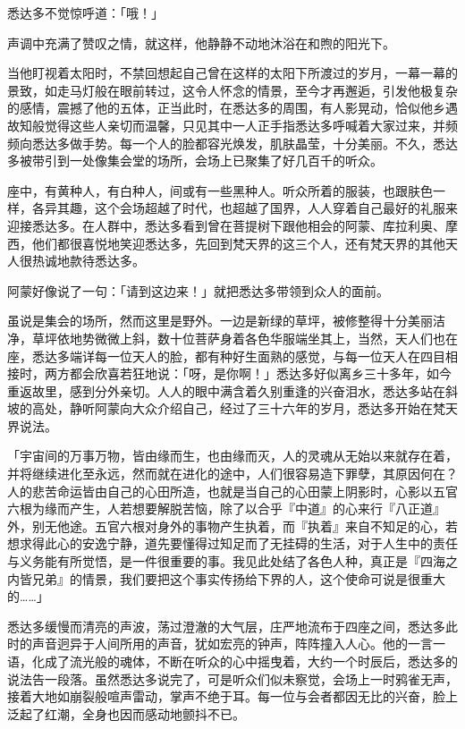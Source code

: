 \documentclass[twoside,openany]{book}
\begin{document}
悉达多不觉惊呼道：「哦！」

声调中充满了赞叹之情，就这样，他静静不动地沐浴在和煦的阳光下。

当他盯视着太阳时，不禁回想起自己曾在这样的太阳下所渡过的岁月，一幕一幕的景致，如走马灯般在眼前转过，这令人怀念的情景，至今才再邂逅，引发他极复杂的感情，震撼了他的五体，正当此时，在悉达多的周围，有人影晃动，恰似他乡遇故知般觉得这些人亲切而温馨，只见其中一人正手指悉达多呼喊着大家过来，并频频向悉达多做手势。每一个人的脸都容光焕发，肌肤晶莹，十分美丽。不久，悉达多被带引到一处像集会堂的场所，会场上已聚集了好几百千的听众。

座中，有黄种人，有白种人，间或有一些黑种人。听众所着的服装，也跟肤色一样，各异其趣，这个会场超越了时代，也超越了国界，人人穿着自己最好的礼服来迎接悉达多。在人群中，悉达多看到曾在菩提树下跟他相会的阿蒙、库拉利奥、摩西，他们都很喜悦地笑迎悉达多，先回到梵天界的这三个人，还有梵天界的其他天人很热诚地款待悉达多。

阿蒙好像说了一句：「请到这边来！」就把悉达多带领到众人的面前。

虽说是集会的场所，然而这里是野外。一边是新绿的草坪，被修整得十分美丽洁净，草坪依地势微微上斜，数十位菩萨身着各色华服端坐其上，当然，天人们也在座，悉达多端详每一位天人的脸，都有种好生面熟的感觉，与每一位天人在四目相接时，两方都会欣喜若狂地说：「呀，是你啊！」悉达多好似离乡三十多年，如今重返故里，感到分外亲切。人人的眼中满含着久别重逢的兴奋泪水，悉达多站在斜坡的高处，静听阿蒙向大众介绍自己，经过了三十六年的岁月，悉达多开始在梵天界说法。

「宇宙间的万事万物，皆由缘而生，也由缘而灭，人的灵魂从无始以来就存在着，并将继续进化至永远，然而就在进化的途中，人们很容易造下罪孽，其原因何在？人的悲苦命运皆由自己的心田所造，也就是当自己的心田蒙上阴影时，心影以五官六根为缘而产生，人若想要解脱苦恼，除了以合乎『中道』的心来行『八正道』外，别无他途。五官六根对身外的事物产生执着，而『执着』来自不知足的心，若想求得此心的安逸宁静，道先要懂得过知足而了无挂碍的生活，对于人生中的责任与义务能有所觉悟，是一件很重要的事。我见此处结了各色人种，真正是『四海之内皆兄弟』的情景，我们要把这个事实传扬给下界的人，这个使命可说是很重大的……」

悉达多缓慢而清亮的声波，荡过澄澈的大气层，庄严地流布于四座之间，悉达多此时的声音迥异于人间所用的声音，犹如宏亮的钟声，阵阵撞入人心。他的一言一语，化成了流光般的魂体，不断在听众的心中摇曳着，大约一个时辰后，悉达多的说法告一段落。虽然悉达多说完了，可是听众们似未察觉，会场上一时鸦雀无声，接着大地如崩裂般喧声雷动，掌声不绝于耳。每一位与会者都因无比的兴奋，脸上泛起了红潮，全身也因而感动地颤抖不已。
\end{document}
